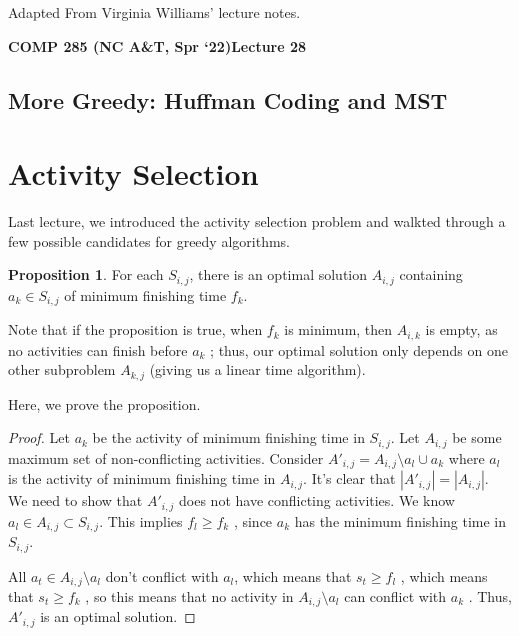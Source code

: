 \documentclass [12pt]{article}
\theoremstyle{definition}
\newtheorem{proposition}{Proposition}
\begin{document}
 

\vspace {1em} 
\begin {Instruction} 
Adapted From Virginia Williams' lecture notes.
\end {Instruction}  

{\LARGE \textbf {COMP 285 (NC A\&T, Spr `22)}\hfill \textbf {Lecture 28} } 

\begin{centering}
\section*{More Greedy: Huffman Coding and MST}
\end{centering}


\section{Activity Selection}

Last lecture, we introduced the activity selection problem and walkted through a few possible candidates for greedy algorithms.

\begin{proposition}
For each $S_{i ,j}$, there is an optimal solution $A_{i ,j}$ containing $a_k \in S_{i ,j}$ of minimum finishing time $f_k$.
\end{proposition}
 

Note that if the proposition is true, when $f_k$ is minimum, then $A_{i ,k}$ is empty, as no activities can finish before $a_k$ ; thus, our optimal solution only depends on one other subproblem $A_{k ,j}$ (giving us a linear time algorithm). 


Here, we prove the proposition.

\begin{proof}

Let $a_k$ be the activity of minimum finishing time in $S_{i ,j}$. Let $A_{i ,j}$ be some maximum set of non-conflicting activities. Consider $A'_{i ,j} = A_{i ,j} \setminus {a_l} \cup {a_k}$ where $a_l$ is the activity of minimum finishing time in $A_{i ,j}$. It’s clear that $|A'_{i ,j}| = |A_{i ,j}|$. We need to show that $A'_{i ,j}$ does not have conflicting activities. We know $a_l \in A_{i ,j} \subset S_{i ,j}$. This implies $f_l \geq f_k$ , since $a_k$ has the minimum finishing time in $S_{i ,j}$. 

All $a_t \in A_{i ,j} \setminus {a_l}$ don’t conflict with $a_l $, which means that $s_t \geq f_l$ , which means that $s_t \geq f_k$ , so this means that no activity in $A_{i ,j} \setminus {a_l}$ can conflict with $a_k$ . Thus, $A'_{i ,j}$ is an optimal solution.
\end{proof}
\end{document}
